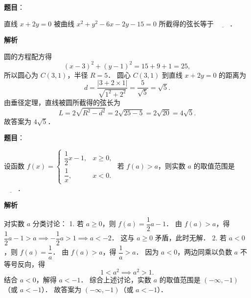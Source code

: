 \begin{answer}

\textbf{题目}：

直线 $x + 2y = 0$ 被曲线 $x^2 + y^2 - 6x - 2y - 15 = 0$ 所截得的弦长等于 $\underline{\quad\quad}$．

\textbf{解析}

圆的方程配方得
\nopagebreak[4]
\[
(x - 3)^2 + (y - 1)^2 = 15 + 9 + 1 = 25,
\]
所以圆心为 $C(3, 1)$，半径 $R = 5$．
圆心 $C(3, 1)$ 到直线 $x + 2y = 0$ 的距离为
\nopagebreak[4]
\[
d = \frac{|3 + 2 \times 1|}{\sqrt{1^2 + 2^2}} = \frac{5}{\sqrt{5}} = \sqrt{5}.
\]
由垂径定理，直线被圆所截得的弦长为
\nopagebreak[4]
\[
L = 2\sqrt{R^2 - d^2} = 2\sqrt{25 - 5} = 2\sqrt{20} = 4\sqrt{5}.
\]
故答案为 $4\sqrt{5}$．


\end{answer}
\begin{answer}

\textbf{题目}：

设函数 $f(x) = \begin{cases} \dfrac{1}{2}x - 1, & x \geqslant 0, \\ \dfrac{1}{x}, & x < 0. \end{cases}$ 若 $f(a) > a$，则实数 $a$ 的取值范围是 $\underline{\quad\quad}$．

\textbf{解析}

对实数 $a$ 分类讨论：
1. 若 $a \geqslant 0$，则 $f(a) = \dfrac{1}{2}a - 1$．
   由 $f(a) > a$，得 $\dfrac{1}{2}a - 1 > a \implies -\dfrac{1}{2}a > 1 \implies a < -2$．
   这与 $a \geqslant 0$ 矛盾，此时无解．
2. 若 $a < 0$，则 $f(a) = \dfrac{1}{a}$．
   由 $f(a) > a$，得 $\dfrac{1}{a} > a$．
   因为 $a < 0$，两边同乘以负数 $a$ 不等号反向，得
\nopagebreak[4]
\[
1 < a^2 \implies a^2 > 1.
\]
   结合 $a < 0$，解得 $a < -1$．
综合上述讨论，实数 $a$ 的取值范围是 $(-\infty, -1)$（或 $a < -1$）．
故答案为 $(-\infty, -1)$（或 $a < -1$）．


\end{answer}
